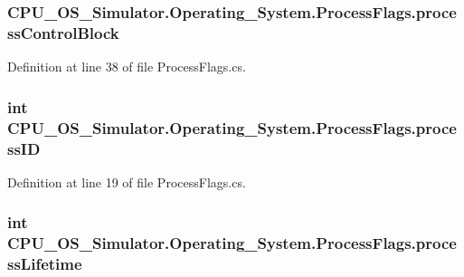 \subsubsection[{process\+Control\+Block}]{ C\+P\+U\+\_\+\+O\+S\+\_\+\+Simulator.\+Operating\+\_\+\+System.\+Process\+Flags.\+process\+Control\+Block}\label{struct_c_p_u___o_s___simulator_1_1_operating___system_1_1_process_flags_adca49f9a3ee1f5e380a7547b0b8b73d6}


Definition at line 38 of file Process\+Flags.\+cs.

\hypertarget{struct_c_p_u___o_s___simulator_1_1_operating___system_1_1_process_flags_a5a0ef784d6cef8d5d42ab43b69972f5b}{}
\subsubsection[{process\+I\+D}]{\setlength{\rightskip}{0pt plus 5cm}int C\+P\+U\+\_\+\+O\+S\+\_\+\+Simulator.\+Operating\+\_\+\+System.\+Process\+Flags.\+process\+I\+D}\label{struct_c_p_u___o_s___simulator_1_1_operating___system_1_1_process_flags_a5a0ef784d6cef8d5d42ab43b69972f5b}


Definition at line 19 of file Process\+Flags.\+cs.

\hypertarget{struct_c_p_u___o_s___simulator_1_1_operating___system_1_1_process_flags_a45de0517d0705f5c9ff1322e969cae20}{}
\subsubsection[{process\+Lifetime}]{\setlength{\rightskip}{0pt plus 5cm}int C\+P\+U\+\_\+\+O\+S\+\_\+\+Simulator.\+Operating\+\_\+\+System.\+Process\+Flags.\+process\+Lifetime}\label{struct_c_p_u___o_s___simulator_1_1_operating___system_1_1_process_flags_a45de0517d0705f5c9ff1322e969cae20}


